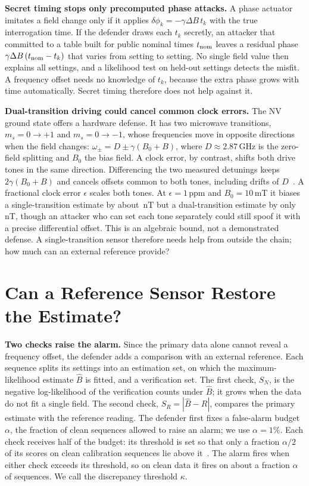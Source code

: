 \documentclass[conference,9pt]{IEEEtran}
\newcommand{\Bhat}{\widehat{B}}
\begin{document}
\textbf{Secret timing stops only precomputed phase attacks.} A phase actuator imitates a field
change only if it applies $\delta\phi_k=-\gamma\Delta B\,t_k$ with the true interrogation time.
If the defender draws each $t_k$ secretly, an attacker that committed to a table built for public
nominal times $t_{\rm nom}$ leaves a residual phase $\gamma\Delta B\,(t_{\rm nom}-t_k)$ that varies
from setting to setting. No single field value then explains all settings, and a likelihood test
on held-out settings detects the misfit. A frequency offset needs no knowledge of $t_k$, because the
extra phase grows with time automatically. Secret timing therefore does not help against it.

\textbf{Dual-transition driving could cancel common clock errors.} The NV ground state offers a
hardware defense. It has two microwave transitions, $m_s=0\to+1$ and $m_s=0\to-1$, whose
frequencies move in opposite directions when the field changes:
$\omega_\pm=D\pm\gamma(B_0+B)$, where $D\approx2.87$\,GHz is the zero-field splitting and $B_0$
the bias field. A clock error, by contrast, shifts both drive tones in the same direction. Differencing the two measured detunings keeps $2\gamma(B_0+B)$ and cancels offsets common to both
tones, including drifts of $D$~\cite{fang2013quantumbeats,bauch2018ultralong,hart2021dq}. A fractional clock
error $\epsilon$ scales both tones. At $\epsilon=1$\,ppm and $B_0=10$\,mT it biases a
single-transition estimate by about \ClockSingleBias{}\,nT but a dual-transition estimate by only
\ClockDualBias{}\,nT, though an attacker who can set each tone separately could still spoof it with a precise
differential offset.
This is an algebraic bound, not a demonstrated defense. A single-transition sensor therefore needs
help from outside the chain; how much can an external reference provide?

\section{Can a Reference Sensor Restore the Estimate?}
\label{sec:reference}

\textbf{Two checks raise the alarm.} Since the primary data alone cannot reveal a frequency offset,
the defender adds a comparison with an external reference. Each sequence splits its settings into an estimation set, on
which the maximum-likelihood estimate $\Bhat$ is fitted, and a verification set. The first check,
$S_N$, is the negative log-likelihood of the verification counts under $\Bhat$; it grows when the
data do not fit a single field. The second check, $S_R=|\Bhat-R|$, compares the primary estimate
with the reference reading. The defender first fixes a false-alarm budget $\alpha$, the fraction of
clean sequences allowed to raise an alarm; we use $\alpha=1\%$. Each check receives half of the
budget: its threshold is set so that only a fraction $\alpha/2$ of its scores on clean calibration
sequences lie above it~\cite{angelopoulos2023conformal}. The alarm fires when either check exceeds
its threshold, so on clean data it fires on about a fraction $\alpha$ of sequences. We call the discrepancy
threshold $\kappa$.
\end{document}
